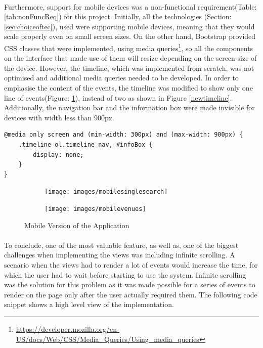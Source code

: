 \documentclass{l4proj}
\begin{document}
\paragraph{}
Furthermore, support for mobile devices was a non-functional requirement(Table: \ref{tab:nonFuncReq}) for this project. Initially, all the technologies (Section: \ref{sec:choiceoftec}), used were supporting mobile devices, meaning that they would scale properly even on small screen sizes. On the other hand, Bootstrap provided CSS classes that were implemented, using media queries\footnote{\url{https://developer.mozilla.org/en-US/docs/Web/CSS/Media_Queries/Using_media_queries}}, so all the components on the interface that made use of them will resize depending on the screen size of the device. However, the timeline, which was implemented from scratch, was not optimised and additional media queries needed to be developed. In order to emphasise the content of the events, the timeline was modified to show only one line of events(Figure: \ref{mobversion1}), instead of two as shown in Figure \ref{newtimeline}. Additionally, the navigation bar and the information box were made invisible for devices with width less than 900px. 
\begin{lstlisting}
@media only screen and (min-width: 300px) and (max-width: 900px) {
	.timeline ol.timeline_nav, #infoBox {
		display: none;
	}
}
\end{lstlisting}

\begin{figure}[H]
	\centering
	\begin{subfigure}{.2\textwidth}
		\texttt{[image: images/mobilesinglesearch]}
		\label{mobversion1}
	\end{subfigure}
	\begin{subfigure}{.2\textwidth}
		\texttt{[image: images/mobilevenues]}
		\label{mobversion2}
	\end{subfigure}
		\caption{Mobile Version of the Application}
\end{figure}

\paragraph{}
To conclude, one of the most valuable feature, as well as, one of the biggest challenges when implementing the views was including infinite scrolling. A scenario when the views had to render a lot of events would increase the time, for which the user had to wait before starting to use the system. Infinite scrolling was the solution for this problem as it was made possible for a series of events to render on the page only after the user actually required them. The following code snippet shows a high level view of the implementation.
\end{document}
